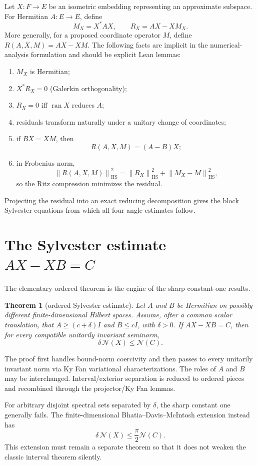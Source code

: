 \documentclass[11pt]{article}
\newcommand{\Nn}{\mathcal N}
\newcommand{\ran}{\operatorname{ran}}
\newcommand{\HS}{\mathrm{HS}}
\newcommand{\norm}[1]{\left\lVert#1\right\rVert}
\newtheorem{theorem}{Theorem}[section]
\theoremstyle{remark}
\begin{document}
Let \(X:F\to E\) be an isometric embedding representing an approximate
subspace.  For Hermitian \(A:E\to E\), define
\[
  M_X=X^*AX,\qquad R_X=AX-XM_X.
\]
More generally, for a proposed coordinate operator \(M\), define
\(R(A,X,M)=AX-XM\).  The following facts are implicit in the numerical-analysis
formulation and should be explicit Lean lemmas:
\begin{enumerate}
\item \(M_X\) is Hermitian;
\item \(X^*R_X=0\) (Galerkin orthogonality);
\item \(R_X=0\) iff \(\ran X\) reduces \(A\);
\item residuals transform naturally under a unitary change of coordinates;
\item if \(BX=XM\), then
\[
  R(A,X,M)=(A-B)X;
\]
\item in Frobenius norm,
\[
  \norm{R(A,X,M)}_{\HS}^2
  =\norm{R_X}_{\HS}^2+\norm{M_X-M}_{\HS}^2,
\]
so the Ritz compression minimizes the residual.
\end{enumerate}

Projecting the residual into an exact reducing decomposition gives the block
Sylvester equations from which all four angle estimates follow.

\section{The Sylvester estimate \texorpdfstring{$AX-XB=C$}{AX-XB=C}}

The elementary ordered theorem is the engine of the sharp constant-one
results.

\begin{theorem}[ordered Sylvester estimate]
Let \(A\) and \(B\) be Hermitian on possibly different finite-dimensional
Hilbert spaces.  Assume, after a common scalar translation, that
\(A\ge(c+\delta)I\) and \(B\le cI\), with \(\delta>0\).  If
\(AX-XB=C\), then for every compatible unitarily invariant seminorm,
\[
  \delta\,\Nn(X)\le\Nn(C).
\]
\end{theorem}

The proof first handles bound-norm coercivity and then passes to every
unitarily invariant norm via Ky Fan variational characterizations.  The roles
of \(A\) and \(B\) may be interchanged.  Interval/exterior separation is
reduced to ordered pieces and recombined through the projector/Ky Fan lemmas.

For arbitrary disjoint spectral sets separated by \(\delta\), the sharp
constant one generally fails.  The finite-dimensional Bhatia--Davis--McIntosh
extension instead has
\[
  \delta\,\Nn(X)\le \frac{\pi}{2}\Nn(C).
\]
This extension must remain a separate theorem so that it does not weaken the
classic interval theorem silently.
\end{document}
